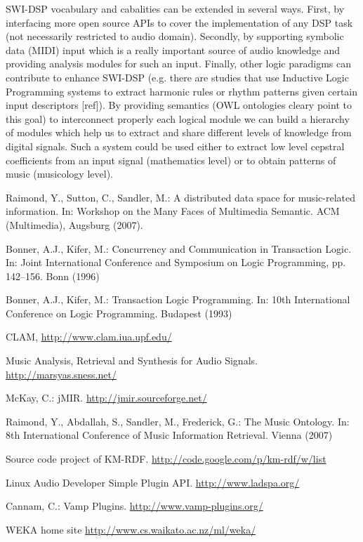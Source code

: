 \documentclass[runningheads]{llncs}
\begin{document}
SWI-DSP vocabulary and cabalities can be extended in several ways. First, by interfacing more open source APIs to cover the implementation of any DSP task (not necessarily restricted to audio domain). Secondly, by supporting symbolic data (MIDI) input which is a really important source of audio knowledge and providing analysis modules for such an input. Finally, other logic paradigms can contribute to enhance SWI-DSP (e.g. there are studies that use Inductive Logic Programming systems to extract harmonic rules or rhythm patterns given certain input descriptors [ref]). By providing semantics (OWL ontologies cleary point to this goal) to interconnect properly each logical module we can build a hierarchy of modules which help us to extract and share different levels of knowledge from digital signals. Such a system could be used either to extract low level cepstral coefficients from an input signal (mathematics level) or to obtain patterns of music (musicology level).

\begin{thebibliography}{4}

 Raimond, Y., Sutton, C., Sandler, M.: A distributed data space for music-related information. In: Workshop on the Many Faces of Multimedia Semantic. ACM (Multimedia), Augsburg (2007).

 Bonner, A.J., Kifer, M.: Concurrency and Communication in Transaction Logic. In: Joint International Conference and Symposium on Logic Programming, pp. 142--156. Bonn (1996)

 Bonner, A.J., Kifer, M.: Transaction Logic Programming. In: 10th International Conference on Logic Programming. Budapest (1993)

 CLAM, \url{http://www.clam.iua.upf.edu/}

 Music Analysis, Retrieval and Synthesis for Audio Signals. \url{http://marsyas.sness.net/}

 McKay, C.: jMIR. \url{http://jmir.sourceforge.net/}

 Raimond, Y., Abdallah, S., Sandler, M., Frederick, G.: The Music Ontology. In: 8th International Conference of Music Information Retrieval. Vienna (2007)

 Source code project of KM-RDF. \url{http://code.google.com/p/km-rdf/w/list}

 Linux Audio Developer Simple Plugin API. \url{http://www.ladspa.org/}

 Cannam, C.: Vamp Plugins. \url{http://www.vamp-plugins.org/}

 WEKA home site \url{http://www.cs.waikato.ac.nz/ml/weka/}

\end{thebibliography}
\end{document}
